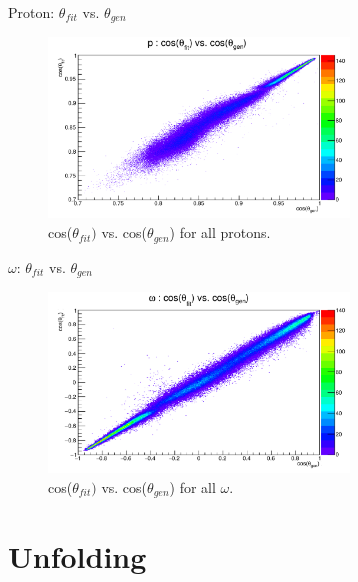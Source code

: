 \documentclass[
		10pt
		]{beamer}
\begin{document}
\begin{frame}{Proton: $\theta_{fit}$ vs. $\theta_{gen}$}
	\begin{figure}
		\includegraphics[width=8cm]{Plots/MC/1/ThetaTheta1Proton.pdf}
		\captionsetup{labelformat=empty}
		\caption{cos($\theta_{fit})$ vs. cos($\theta_{gen}$) for all protons.}
	\end{figure}
\end{frame}

\begin{frame} {$\omega$: $\theta_{fit}$ vs. $\theta_{gen}$}

\begin{figure}
	
	\includegraphics[width=8cm]{Plots/MC/1/ThetaTheta1Omega.pdf}
	\captionsetup{labelformat=empty}
	\caption{cos($\theta_{fit})$ vs. cos($\theta_{gen}$) for all $\omega$.}
	
\end{figure}

\end{frame}

	



\section{Unfolding}
\end{document}
